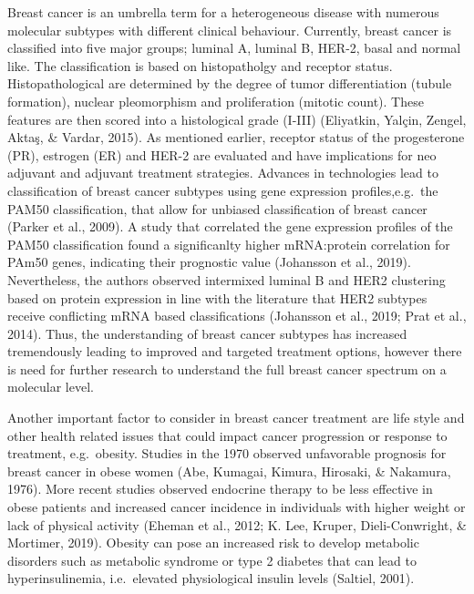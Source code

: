 \documentclass[12pt,openany]{book}
\begin{document}
Breast cancer is an umbrella term for a heterogeneous disease with
numerous molecular subtypes with different clinical behaviour.
Currently, breast cancer is classified into five major groups; luminal
A, luminal B, HER-2, basal and normal like. The classification is based
on histopatholgy and receptor status. Histopathological are determined
by the degree of tumor differentiation (tubule formation), nuclear
pleomorphism and proliferation (mitotic count). These features are then
scored into a histological grade (I-III) (Eliyatkin, Yalçin, Zengel,
Aktaş, \& Vardar, 2015). As mentioned earlier, receptor status of the
progesterone (PR), estrogen (ER) and HER-2 are evaluated and have
implications for neo adjuvant and adjuvant treatment strategies.
Advances in technologies lead to classification of breast cancer
subtypes using gene expression profiles,e.g.~the PAM50 classification,
that allow for unbiased classification of breast cancer (Parker et al.,
2009). A study that correlated the gene expression profiles of the PAM50
classification found a significanlty higher mRNA:protein correlation for
PAm50 genes, indicating their prognostic value (Johansson et al., 2019).
Nevertheless, the authors observed intermixed luminal B and HER2
clustering based on protein expression in line with the literature that
HER2 subtypes receive conflicting mRNA based classifications (Johansson
et al., 2019; Prat et al., 2014). Thus, the understanding of breast
cancer subtypes has increased tremendously leading to improved and
targeted treatment options, however there is need for further research
to understand the full breast cancer spectrum on a molecular level.

Another important factor to consider in breast cancer treatment are life
style and other health related issues that could impact cancer
progression or response to treatment, e.g.~obesity. Studies in the 1970
observed unfavorable prognosis for breast cancer in obese women (Abe,
Kumagai, Kimura, Hirosaki, \& Nakamura, 1976). More recent studies
observed endocrine therapy to be less effective in obese patients and
increased cancer incidence in individuals with higher weight or lack of
physical activity (Eheman et al., 2012; K. Lee, Kruper, Dieli-Conwright,
\& Mortimer, 2019). Obesity can pose an increased risk to develop
metabolic disorders such as metabolic syndrome or type 2 diabetes that
can lead to hyperinsulinemia, i.e.~elevated physiological insulin levels
(Saltiel, 2001).
\end{document}
